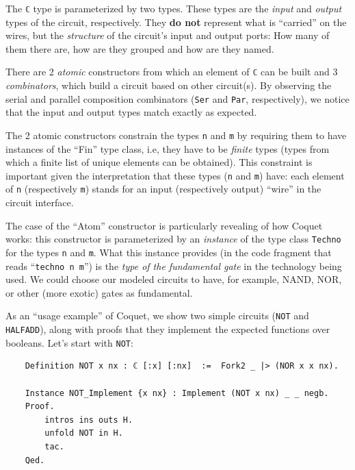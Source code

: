 \documentclass[a4paper]{article}
\begin{document}
                The \texttt{ℂ} type is parameterized by two types. These types are the \emph{input} and
                \emph{output} types of the circuit, respectively. They \textbf{do not} represent
                what is ``carried'' on the wires, but the \emph{structure} of the circuit's input
                and output ports: How many of them there are, how are they grouped and how are they
                named.

                There are 2 \emph{atomic} constructors from which an element of \texttt{ℂ} can be
                built and 3 \emph{combinators}, which build a circuit based on other circuit(s). By
                observing the serial and parallel composition combinators (\texttt{Ser} and
                \texttt{Par}, respectively), we notice that the input and output types match exactly
                as expected.

                The 2 atomic constructors constrain the types \texttt{n} and \texttt{m} by requiring
                them to have instances of the ``Fin'' type class, i.e, they have to be \emph{finite}
                types (types from which a finite list of unique elements can be obtained). This
                constraint is important given the interpretation that these types (\texttt{n} and
                \texttt{m}) have: each element of \texttt{n} (respectively \texttt{m}) stands for an
                input (respectively output) ``wire'' in the circuit interface.

                The case of the ``Atom'' constructor is particularly revealing of how Coquet works:
                this constructor is parameterized by an \emph{instance} of the type class
                \texttt{Techno} for the types \texttt{n} and \texttt{m}. What this instance provides
                (in the code fragment that reads ``\texttt{techno n m}'') is the \emph{type of the
                    fundamental gate} in the technology being used. We could choose our modeled
                circuits to have, for example, NAND, NOR, or other (more exotic) gates as
                fundamental.

                As an ``usage example'' of Coquet, we show two simple circuits (\texttt{NOT} and
                \texttt{HALFADD}), along with proofs that they implement the expected functions over
                booleans. Let's start with \texttt{NOT}:
                \begin{verbatim}
    Definition NOT x nx : ℂ [:x] [:nx]  :=  Fork2 _ |> (NOR x x nx).

    Instance NOT_Implement {x nx} : Implement (NOT x nx) _ _ negb.
    Proof.
        intros ins outs H.
        unfold NOT in H.
        tac.
    Qed.
                \end{verbatim}
\end{document}

